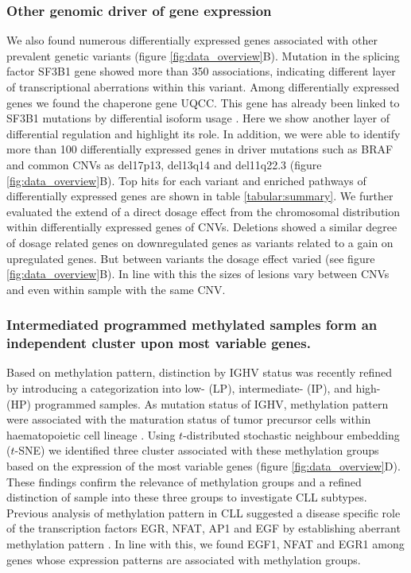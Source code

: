 \subsubsection{Other genomic driver of gene expression}
We also found numerous differentially expressed genes associated with other prevalent genetic variants (figure \ref {fig:data_overview}B). Mutation in the splicing factor SF3B1 gene showed more than 350 associations, indicating different layer of transcriptional aberrations within this variant. Among differentially expressed genes we found the chaperone gene UQCC. This gene has already been linked to SF3B1 mutations by differential isoform usage \citep{Reyes}. Here we show another layer of differential regulation and highlight its role. In addition, we were able to identify more than 100 differentially expressed genes in driver mutations such as BRAF and common CNVs as del17p13, del13q14 and del11q22.3 (figure \ref{fig:data_overview}B).
Top hits for each variant and enriched pathways of differentially expressed genes are shown in table \ref {tabular:summary}. We further evaluated the extend of a direct dosage effect from the chromosomal distribution within differentially expressed genes of CNVs. Deletions showed a similar degree of dosage related genes on downregulated genes as variants related to a gain on upregulated genes. But between variants the dosage effect varied (see figure \ref{fig:data_overview}B). In line with this the sizes of lesions vary between CNVs and even within sample with the same CNV.



\subsubsection{Intermediated programmed methylated samples form an independent cluster upon most variable genes.}
Based on methylation pattern, distinction by IGHV status was recently refined by introducing a categorization into low- (LP), intermediate- (IP), and high- (HP) programmed samples. As mutation status of IGHV, methylation pattern were associated with the maturation status of tumor precursor cells within haematopoietic cell lineage \citep{Oakes2016}. Using $t$-distributed stochastic neighbour embedding ($t$-SNE) we identified three cluster associated with these methylation groups based on the expression of the most variable genes (figure \ref {fig:data_overview}D). These findings confirm the relevance of methylation groups and a refined distinction of sample into these three groups to investigate CLL subtypes. Previous analysis of methylation pattern in CLL suggested a disease specific role of the transcription factors EGR, NFAT, AP1 and EGF by establishing aberrant methylation pattern \citep{Oakes2016}. In line with this, we found EGF1, NFAT and EGR1 among genes whose expression patterns are associated with methylation groups. 



